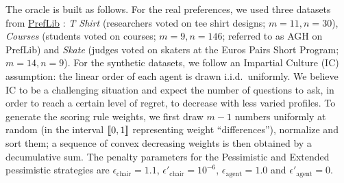 \documentclass[runningheads]{llncs}
\theoremstyle{remark}
\begin{document}
The oracle is built as follows. 
For the real preferences, we used three datasets from \href{https://www.preflib.org/}{PrefLib} \cite{PrefLib}: \textit{T Shirt} (researchers voted on tee shirt designs; $m \!=\! 11, n \!=\! 30$),
\textit{Courses}  (students voted on courses; $m \!=\! 9, n \!=\! 146$; referred to as AGH on PrefLib)
and \emph{Skate} (judges voted on skaters at the Euros Pairs Short Program; $m \!=\! 14, n \!=\! 9$).
For the synthetic datasets, we follow an Impartial Culture (IC) assumption: the linear order of each agent is drawn i.i.d.\ uniformly.
We believe IC to be a challenging situation and expect the number of questions to ask, in order to reach a certain level of regret, to decrease with less varied profiles.
To generate the scoring rule weights, we first draw $m \!-\! 1$ numbers uniformly at random (in the interval $\llbracket 0,1 \rrbracket$ representing weight ``differences''), normalize and sort them; a sequence of convex decreasing weights is then obtained by a decumulative sum. The penalty parameters for the Pessimistic and Extended pessimistic strategies are  $\epsilon_{\text{chair}} = 1.1$, $\epsilon'_{\text{chair}} = 10^{-6}$, $\epsilon_{\text{agent}} = 1.0$ and $\epsilon'_{\text{agent}} = 0$.
\end{document}
